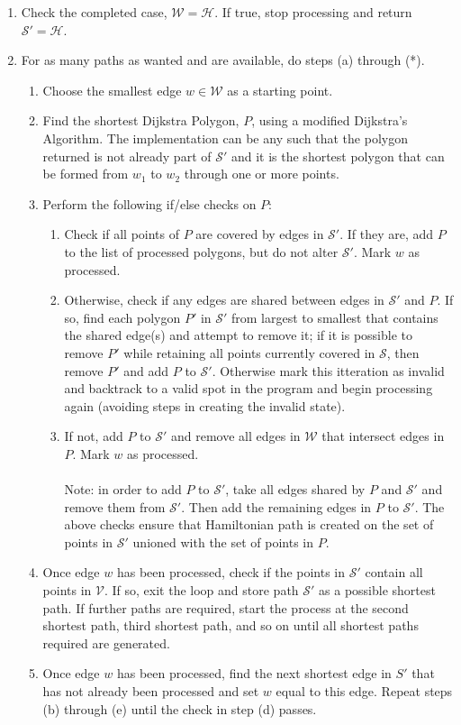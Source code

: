 \documentclass[12pt]{article}
\begin{document}
\begin{enumerate}
\item Check the completed case, $\mathcal{W} = \mathcal{H}$.
If true, stop processing and return $\mathcal{S}' = \mathcal{H}$.
\item For as many paths as wanted and are available, do steps (a) through (*).
\begin{enumerate}
\item Choose the smallest edge $w \in \mathcal{W}$ as a starting point.
\item Find the shortest Dijkstra Polygon, $P$,
using a modified Dijkstra's Algorithm.
The implementation can be any such that the polygon returned is not already part of
$\mathcal{S}'$ and it is the shortest polygon that can be formed from
$w_1$ to $w_2$ through one or more points.
\item Perform the following if/else checks on $P$:
\begin{enumerate}
\item Check if all points of $P$ are covered by edges in $\mathcal{S}'$.
If they are, add $P$
to the list of processed polygons, but do not alter $\mathcal{S}'$.
Mark $w$ as processed.
\item Otherwise, check if any edges are shared between edges in $\mathcal{S}'$ and $P$.
If so, find each polygon $P'$ in $\mathcal{S}'$ from largest to smallest that contains
the shared edge(s) and attempt to remove it; if it is possible to remove $P'$
while retaining all points currently covered in $\mathcal{S}$, then remove $P'$
and add $P$ to $\mathcal{S}'$. Otherwise mark this itteration as invalid and backtrack
to a valid spot in the program and begin processing again
(avoiding steps in creating the invalid state).
\item If not, add $P$ to $\mathcal{S}'$ and remove all edges in $\mathcal{W}$
that intersect edges in $P$.
Mark $w$ as processed.
\\\\
Note: in order to add $P$ to $\mathcal{S}'$, take all edges shared by
$P$ and $\mathcal{S}'$ and remove them from $\mathcal{S}'$. Then add the remaining edges
in $P$ to $\mathcal{S}'$. The above checks ensure that Hamiltonian path is created
on the set of points in $\mathcal{S}'$ unioned with the set of points in $P$.
\end{enumerate}
\item Once edge $w$ has been processed, check if the points in $\mathcal{S}'$
contain all points in $\mathcal{V}$. If so, exit the loop and store path
$\mathcal{S}'$ as a possible shortest path. If further paths are required,
start the process at the second shortest path, third shortest path, and so on until
all shortest paths required are generated.
\item Once edge $w$ has been processed, find the next shortest edge in $S'$
that has not already been processed and set $w$ equal to this edge.
Repeat steps (b) through (e) until
the check in step (d) passes.
\end{enumerate}
\end{enumerate}
\end{document}
